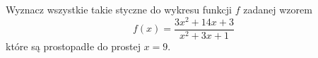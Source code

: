 Wyznacz wszystkie takie styczne do wykresu funkcji $f$ zadanej wzorem 
\[
	f(x)=\frac{3x^2+14x+3}{x^2+3x+1}
\]
które są prostopadłe do prostej $x=9$.
	